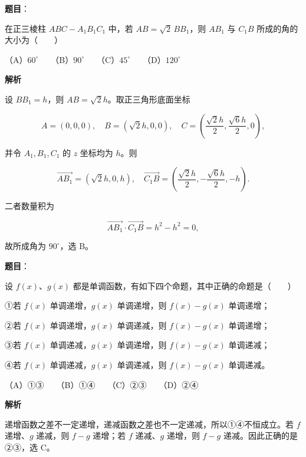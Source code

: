 \begin{answer}

\textbf{题目}：

在正三棱柱 $ABC-A_1B_1C_1$ 中，若 $AB=\sqrt2\,BB_1$，则 $AB_1$ 与 $C_1B$ 所成的角的大小为\mbox{（　　）}

（A）$60^\circ$　　（B）$90^\circ$　　（C）$45^\circ$　　（D）$120^\circ$

\textbf{解析}

设 $BB_1=h$，则 $AB=\sqrt2h$。取正三角形底面坐标

\nopagebreak[4]
\[
A=(0,0,0),\quad B=(\sqrt2h,0,0),\quad
C=\left(\frac{\sqrt2h}{2},\frac{\sqrt6h}{2},0\right),
\]

并令 $A_1,B_1,C_1$ 的 $z$ 坐标均为 $h$。则

\nopagebreak[4]
\[
\overrightarrow{AB_1}=(\sqrt2h,0,h),
\quad
\overrightarrow{C_1B}=\left(\frac{\sqrt2h}{2},-\frac{\sqrt6h}{2},-h\right).
\]

二者数量积为

\nopagebreak[4]
\[
\overrightarrow{AB_1}\cdot\overrightarrow{C_1B}
=h^2-\!h^2=0,
\]

故所成角为 $90^\circ$，选 B。


\end{answer}
\begin{answer}

\textbf{题目}：

设 $f(x)$、$g(x)$ 都是单调函数，有如下四个命题，其中正确的命题是\mbox{（　　）}

①若 $f(x)$ 单调递增，$g(x)$ 单调递增，则 $f(x)-g(x)$ 单调递增；

②若 $f(x)$ 单调递增，$g(x)$ 单调递减，则 $f(x)-g(x)$ 单调递增；

③若 $f(x)$ 单调递减，$g(x)$ 单调递增，则 $f(x)-g(x)$ 单调递减；

④若 $f(x)$ 单调递减，$g(x)$ 单调递减，则 $f(x)-g(x)$ 单调递减。

（A）①③　　（B）①④　　（C）②③　　（D）②④

\textbf{解析}

递增函数之差不一定递增，递减函数之差也不一定递减，所以①④不恒成立。若 $f$ 递增、$g$ 递减，则 $f-g$ 递增；若 $f$ 递减、$g$ 递增，则 $f-g$ 递减。因此正确的是②③，选 C。


\end{answer}
